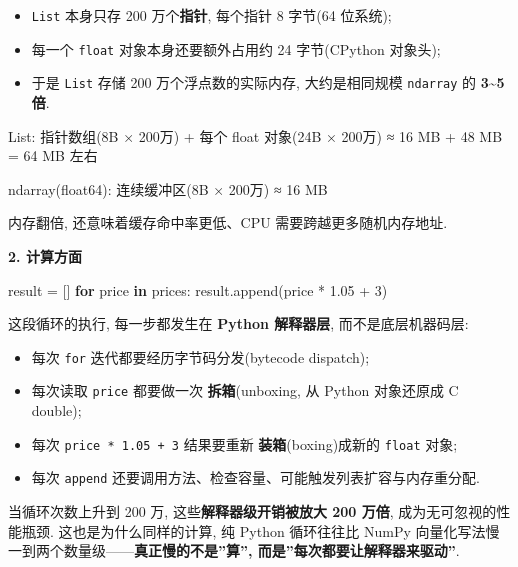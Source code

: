 \documentclass[11pt]{article}
\providecommand{\tightlist}{%
      \setlength{\itemsep}{0pt}\setlength{\parskip}{0pt}}
\newenvironment{Shaded}{}{}
\newcommand{\KeywordTok}[1]{\textcolor[rgb]{0.00,0.44,0.13}{\textbf{{#1}}}}
\newcommand{\DecValTok}[1]{\textcolor[rgb]{0.25,0.63,0.44}{{#1}}}
\newcommand{\FloatTok}[1]{\textcolor[rgb]{0.25,0.63,0.44}{{#1}}}
\newcommand{\NormalTok}[1]{{#1}}
\newcommand{\ControlFlowTok}[1]{\textcolor[rgb]{0.00,0.44,0.13}{\textbf{{#1}}}}
\newcommand{\OperatorTok}[1]{\textcolor[rgb]{0.40,0.40,0.40}{{#1}}}
\begin{document}
\begin{itemize}
\tightlist
\item
  \texttt{List} 本身只存 200 万个\textbf{指针}, 每个指针 8 字节(64
  位系统);
\item
  每一个 \texttt{float} 对象本身还要额外占用约 24 字节(CPython 对象头);
\item
  于是 \texttt{List} 存储 200 万个浮点数的实际内存, 大约是相同规模
  \texttt{ndarray} 的 \textbf{3\textasciitilde5 倍}.
\end{itemize}

\begin{Shaded}
\begin{Highlighting}[]
\NormalTok{List:}
\NormalTok{  指针数组(8B × 200万) + 每个 float 对象(24B × 200万)}
\NormalTok{  ≈ 16 MB + 48 MB = 64 MB 左右}

\NormalTok{ndarray(float64):}
\NormalTok{  连续缓冲区(8B × 200万)}
\NormalTok{  ≈ 16 MB}
\end{Highlighting}
\end{Shaded}

内存翻倍, 还意味着缓存命中率更低、CPU 需要跨越更多随机内存地址.

\textbf{2. 计算方面}

\begin{Shaded}
\begin{Highlighting}[]
\NormalTok{result }\OperatorTok{=}\NormalTok{ []}
\ControlFlowTok{for}\NormalTok{ price }\KeywordTok{in}\NormalTok{ prices:}
\NormalTok{    result.append(price }\OperatorTok{*} \FloatTok{1.05} \OperatorTok{+} \DecValTok{3}\NormalTok{)}
\end{Highlighting}
\end{Shaded}

这段循环的执行, 每一步都发生在 \textbf{Python 解释器层},
而不是底层机器码层:

\begin{itemize}
\tightlist
\item
  每次 \texttt{for} 迭代都要经历字节码分发(bytecode dispatch);
\item
  每次读取 \texttt{price} 都要做一次 \textbf{拆箱}(unboxing, 从 Python
  对象还原成 C double);
\item
  每次 \texttt{price\ *\ 1.05\ +\ 3} 结果要重新
  \textbf{装箱}(boxing)成新的 \texttt{float} 对象;
\item
  每次 \texttt{append}
  还要调用方法、检查容量、可能触发列表扩容与内存重分配.
\end{itemize}

当循环次数上升到 200 万, 这些\textbf{解释器级开销被放大 200 万倍},
成为无可忽视的性能瓶颈. 这也是为什么同样的计算, 纯 Python 循环往往比
NumPy 向量化写法慢一到两个数量级------\textbf{真正慢的不是''算'',
而是''每次都要让解释器来驱动''}.
\end{document}
